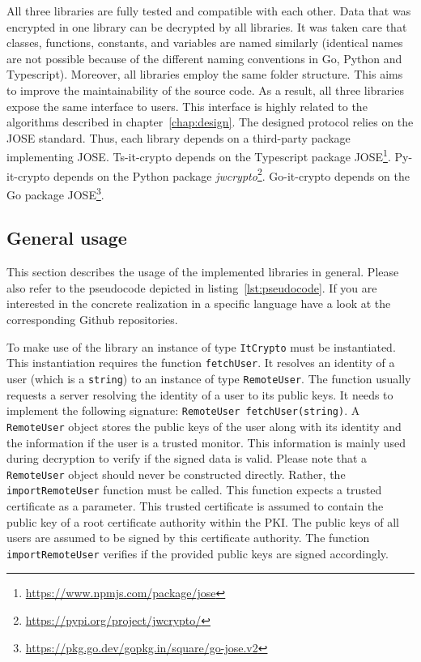 \documentclass[../main.tex]{subfiles}
\begin{document}
All three libraries are fully tested and compatible with each other.
Data that was encrypted in one library can be decrypted by all libraries.
It was taken care that classes, functions, constants, and variables are named similarly (identical names are not possible because of the different naming conventions in Go, Python and Typescript).
Moreover, all libraries employ the same folder structure.
This aims to improve the maintainability of the source code.
As a result, all three libraries expose the same interface to users.
This interface is highly related to the algorithms described in chapter~\ref{chap:design}.
The designed protocol relies on the JOSE standard.
Thus, each library depends on a third-party package implementing JOSE.
Ts-it-crypto depends on the Typescript package JOSE\footnote{\url{https://www.npmjs.com/package/jose}}.
Py-it-crypto depends on the Python package \emph{jwcrypto}\footnote{\url{https://pypi.org/project/jwcrypto/}}.
Go-it-crypto depends on the Go package JOSE\footnote{\url{https://pkg.go.dev/gopkg.in/square/go-jose.v2}}.

\subsection{General usage}

This section describes the usage of the implemented libraries in general.
Please also refer to the pseudocode depicted in listing~\ref{lst:pseudocode}.
If you are interested in the concrete realization in a specific language have a look at the corresponding Github repositories.

To make use of the library an instance of type \verb|ItCrypto| must be instantiated.
This instantiation requires the function \verb|fetchUser|.
It resolves an identity of a user (which is a \verb|string|) to an instance of type \verb|RemoteUser|.
The function usually requests a server resolving the identity of a user to its public keys.
It needs to implement the following signature: \verb|RemoteUser fetchUser(string)|.
A \verb|RemoteUser| object stores the public keys of the user along with its identity and the information if the user is a trusted monitor.
This information is mainly used during decryption to verify if the signed data is valid.
Please note that a \verb|RemoteUser| object should never be constructed directly.
Rather, the \verb|importRemoteUser| function must be called.
This function expects a trusted certificate as a parameter.
This trusted certificate is assumed to contain the public key of a root certificate authority within the PKI.
The public keys of all users are assumed to be signed by this certificate authority.
The function \verb|importRemoteUser| verifies if the provided public keys are signed accordingly.
\end{document}

